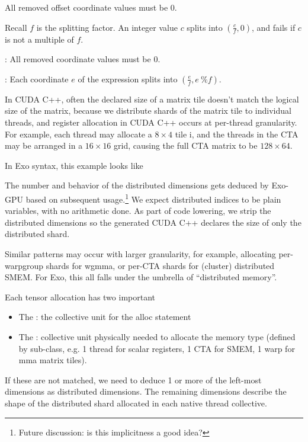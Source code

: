 \filbreak
{} All removed offset coordinate values must be 0.

\filbreak
{} Recall $f$ is the splitting factor. An integer value $c$ splits into $(\frac{c}{f}, 0)$, and fails if $c$ is not a multiple of $f$.

\filbreak
{}: All removed coordinate values must be 0.

\filbreak
{}: Each coordinate $e$ of the expression splits into $(\frac{e}{f}, e~\%f)$.

\FloatBarrier

\newpage
{}

In CUDA C++, often the declared size of a matrix tile doesn't match the logical size of the matrix, because we distribute shards of the matrix tile to individual threads, and register allocation in CUDA C++ occurs at per-thread granularity.
For example, each thread may allocate a $8 \times 4$ tile i, and the threads in the CTA may be arranged in a $16 \times 16$ grid, causing the full CTA matrix to be $128 \times 64$.

\filbreak
In Exo syntax, this example looks like



\filbreak
The number and behavior of the distributed dimensions gets deduced by Exo-GPU based on subsequent usage.\footnote{Future discussion: is this implicitness a good idea?}
We expect distributed indices to be plain variables, with no arithmetic done.
As part of code lowering, we strip the distributed dimensions so the generated CUDA C++ declares the size of only the distributed shard.



\filbreak
Similar patterns may occur with larger granularity, for example, allocating per-warpgroup shards for wgmma, or per-CTA shards for (cluster) distributed SMEM.
For Exo, this all falls under the umbrella of ``distributed memory''.

\filbreak
Each tensor allocation has two important 
\begin{itemize}
  \item The : the collective unit for the alloc statement
  \filbreak
  \item The : collective unit physically needed to allocate the memory type (defined by  sub-class, e.g. 1 thread for scalar registers, 1 CTA for SMEM, 1 warp for mma matrix tiles).
\end{itemize}
\filbreak
If these are not matched, we need to deduce 1 or more of the left-most dimensions as distributed dimensions.
The remaining dimensions describe the shape of the distributed shard allocated in each native thread collective.

